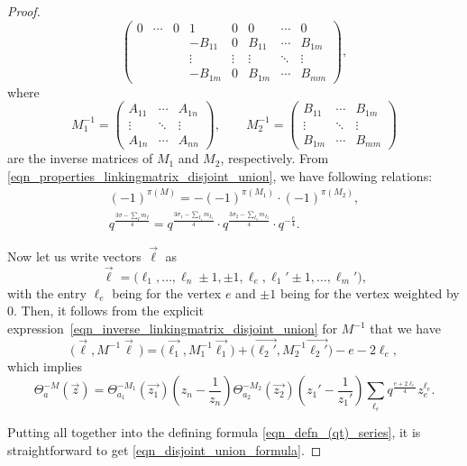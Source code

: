 \documentclass[pdftex]{sigma}
\numberwithin{equation}{section}
\begin{document}
\begin{proof}
\begin{equation}
\begin{pmatrix}
			0&\cdots&0&1&0&0&\cdots&0\\
			&&&-B_{11}&0&B_{11}&\cdots&B_{1m}\\
			&&&\vdots&\vdots&\vdots&\ddots&\vdots\\
			&&&-B_{1m}&0&B_{1m}&\cdots&B_{mm}
		\end{pmatrix},
	\end{equation}
	where
	\[
	M^{-1}_1=\begin{pmatrix}
		A_{11}&\cdots &A_{1n}\\
		\vdots&\ddots&\vdots\\
		A_{1n}&\cdots&A_{nn}
	\end{pmatrix},\qquad M^{-1}_2=\begin{pmatrix}
		B_{11}&\cdots &B_{1m}\\
		\vdots&\ddots&\vdots\\
		B_{1m}&\cdots&B_{mm}
	\end{pmatrix}
	\]
	are the inverse matrices of $ M_1 $ and $ M_2 $, respectively. From \eqref{eqn_properties_linkingmatrix_disjoint_union}, we have following relations:
	\begin{gather*}
			(-1)^{\pi(M)}=-(-1)^{\pi(M_1)}\cdot(-1)^{\pi(M_2)},\\
			q^{\frac{3\sigma-\sum_I m_I}{4}}=q^{\frac{3\sigma_1-\sum_{I_1} m_{I_1}}{4}}\cdot q^{\frac{3\sigma_2-\sum_{I_2} m_{I_2}}{4}}\cdot q^{-\frac{e}{4}}.
		\end{gather*}
	
	Now let us write vectors $ \vec{\ell} $ as
	\[
	\vec{\ell}=\big(\ell_1,\dots,\ell_n\pm1,\pm1,\ell_e,\ell_1'\pm1,\dots,\ell_m'\big),
	\]
	with the entry $ \ell_e $ being for the vertex $ e $ and $ \pm1 $ being for the vertex weighted by $ 0 $. Then, it follows from the explicit expression~\eqref{eqn_inverse_linkingmatrix_disjoint_union} for $ M^{-1} $ that we have
	\begin{equation*}
		\big(\vec{\ell},M^{-1}\vec{\ell}\,\big)=\big(\vec{\ell_1},M^{-1}_1\vec{\ell_1}\big)+\big(\vec{\ell_2'},M^{-1}_2\vec{\ell_2'}\big)-e-2\ell_e,
	\end{equation*}
	which implies
	\begin{equation*}
		\Theta_a^{-M}(\vec{z})=\Theta_{a_1}^{-M_1}(\vec{z_1})\left(z_{n}-\frac{1}{z_n}\right)\Theta_{a_2}^{-M_2}(\vec{z_2})\left(z_{1}'-\frac{1}{z_1'}\right)\sum_{\ell_e}q^{\frac{e+2\ell_e}{4}}z_{e}^{\ell_e}.
	\end{equation*}
	
	Putting all together into the defining formula \eqref{eqn_defn_(qt)_series}, it is straightforward to get \eqref{eqn_disjoint_union_formula}.
\end{proof}
\end{document}
